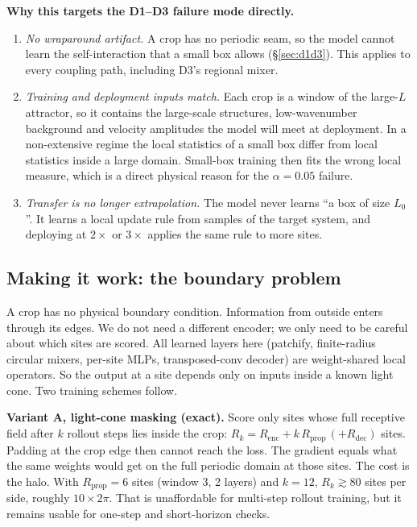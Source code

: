 \documentclass[11pt]{article}
\begin{document}
\textbf{Why this targets the D1--D3 failure mode directly.}
\begin{enumerate}[leftmargin=*]
\item \emph{No wraparound artifact.} A crop has no periodic seam, so the
  model cannot learn the self-interaction that a small box allows
  (\S\ref{sec:d1d3}). This applies to every coupling path, including
  D3's regional mixer.
\item \emph{Training and deployment inputs match.} Each crop is a window
  of the large-$L$ attractor, so it contains the large-scale structures,
  low-wavenumber background and velocity amplitudes the model will meet
  at deployment. In a non-extensive regime the local statistics of a
  small box differ from local statistics inside a large domain. Small-box
  training then fits the wrong local measure, which is a direct
  physical reason for the $\alpha{=}0.05$ failure.
\item \emph{Transfer is no longer extrapolation.} The model never learns
  ``a box of size $L_0$''. It learns a local update rule from samples of
  the target system, and deploying at $2\times$ or $3\times$ applies the
  same rule to more sites.
\end{enumerate}

\subsection{Making it work: the boundary problem}

A crop has no physical boundary condition. Information from outside
enters through its edges. We do not need a different encoder; we only
need to be careful about which sites are scored. All learned layers here
(patchify, finite-radius circular mixers, per-site MLPs, transposed-conv
decoder) are weight-shared local operators. So the output at a site
depends only on inputs inside a known light cone. Two training schemes
follow.

\textbf{Variant A, light-cone masking (exact).} Score only sites whose
full receptive field after $k$ rollout steps lies inside the crop:
$R_k = R_{\mathrm{enc}} + k\,R_{\mathrm{prop}}\,(+R_{\mathrm{dec}})$
sites. Padding at the crop edge then cannot reach the loss. The gradient
equals what the same weights would get on the full periodic domain at
those sites. The cost is the halo. With $R_{\mathrm{prop}}{=}6$ sites
(window 3, 2 layers) and $k{=}12$, $R_k\gtrsim80$ sites per side, roughly
$10\times2\pi$. That is unaffordable for multi-step rollout training, but
it remains usable for one-step and short-horizon checks.
\end{document}
